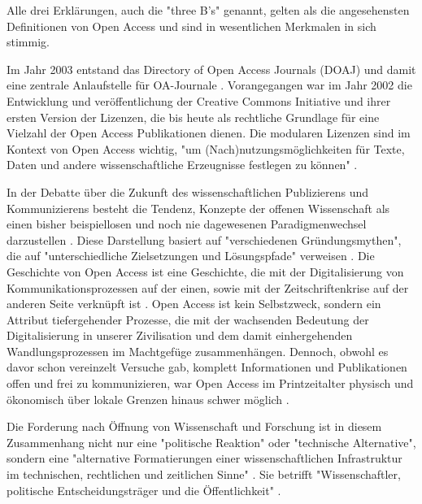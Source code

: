 Alle drei Erklärungen, auch die "three B's"\cite{suber_2004_praising_oa} genannt, gelten als die angesehensten Definitionen von Open Access und sind in wesentlichen Merkmalen in sich stimmig\cite{albert_2006_open_implications}.

Im Jahr 2003 entstand das Directory of Open Access Journals (DOAJ) und damit eine zentrale Anlaufstelle für OA-Journale \cite{suchen-Hoffmann-Zugang-undVerwertung-öffentlicher-Informationen}. Vorangegangen war im Jahr 2002 die Entwicklung und veröffentlichung der Creative Commons Initiative \cite{suchen-Hoffmann-Zugang-undVerwertung-öffentlicher-Informationen} und ihrer ersten Version der Lizenzen, die bis heute als rechtliche Grundlage für eine Vielzahl der Open Access Publikationen dienen\cite{suchen}. Die modularen Lizenzen sind im Kontext von Open Access wichtig, "um (Nach)nutzungsmöglichkeiten für Texte, Daten und andere wissenschaftliche Erzeugnisse festlegen zu können" \cite{suchen-Hoffmann-Zugang-undVerwertung-öffentlicher-Informationen}.

In der Debatte über die Zukunft des wissenschaftlichen Publizierens und Kommunizierens besteht die Tendenz, Konzepte der offenen Wissenschaft als einen bisher beispiellosen und noch nie dagewesenen Paradigmenwechsel darzustellen \cite{cite:17a} \cite{cite:17b}. Diese Darstellung basiert auf "verschiedenen Gründungsmythen", die auf "unterschiedliche Zielsetzungen und Lösungspfade" verweisen \cite{suchen-Hoffmann-Zugang-undVerwertung-öffentlicher-Informationen}. Die Geschichte von Open Access ist eine Geschichte, die mit der Digitalisierung von Kommunikationsprozessen \cite{albert_2006_open_implications} auf der einen, sowie mit der Zeitschriftenkrise auf der anderen Seite verknüpft ist \cite{suchen-Hoffmann-Zugang-undVerwertung-öffentlicher-Informationen}. Open Access ist kein Selbstzweck\cite{cite:17d}, sondern ein Attribut tiefergehender Prozesse, die mit der wachsenden Bedeutung der Digitalisierung in unserer Zivilisation und dem damit einhergehenden Wandlungsprozessen im Machtgefüge zusammenhängen\cite{cite:17e}. Dennoch, obwohl es davor schon vereinzelt Versuche gab, komplett Informationen und Publikationen offen und frei zu kommunizieren, war Open Access im Printzeitalter physisch und ökonomisch über lokale Grenzen hinaus schwer möglich \cite{cite:18a}. 

Die Forderung nach Öffnung von Wissenschaft und Forschung ist in diesem Zusammenhang nicht nur eine "politische Reaktion" oder "technische Alternative", sondern eine "alternative Formatierungen einer wissenschaftlichen Infrastruktur im technischen, rechtlichen und zeitlichen Sinne" \cite{kelty_2004}. Sie betrifft "Wissenschaftler, politische Entscheidungsträger und die Öffentlichkeit" \cite{Scheliga_2014}.

